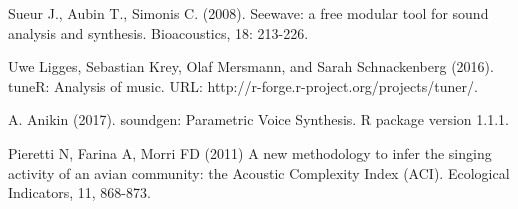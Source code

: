 
\begin{thebibliography}{00}

Sueur J., Aubin T., Simonis C. (2008). 
\newblock Seewave: a free modular tool for sound analysis and synthesis. 
\newblock Bioacoustics, 18: 213-226.

Uwe Ligges, Sebastian Krey, Olaf Mersmann, and Sarah Schnackenberg (2016). 
\newblock tuneR: Analysis of music. 
\newblock URL: http://r-forge.r-project.org/projects/tuner/.

A. Anikin (2017). 
\newblock soundgen: Parametric Voice Synthesis. 
\newblock R package version 1.1.1.

Pieretti N, Farina A, Morri FD (2011) 
\newblock A new methodology to infer the singing activity of an avian community: the Acoustic Complexity Index (ACI). 
\newblock Ecological Indicators, 11, 868-873.
\end{thebibliography}


